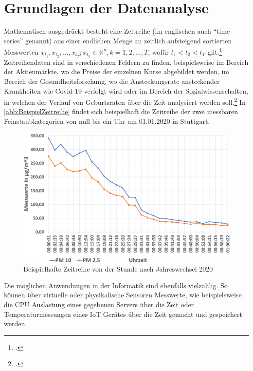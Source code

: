 \section{Grundlagen der Datenanalyse}\label{chap:GrundlagenDatenanalyse}

Mathematisch ausgedrückt besteht eine Zeitreihe (im englischen auch \enquote{time series} genannt) aus einer endlichen Menge an zeitlich aufsteigend sortierten Messwerten $x_{t_1},x_{t_2},...,x_{t_T};  x_{t_k} \in \mathbb{R}^n, k=1,2,...,T$, wofür $t_1 < t_2 < t_T $ gilt.\footcite[Vgl.][1]{Deistler.2018b} 
Zeitreihendaten sind in verschiedenen Feldern zu finden, beispielsweise im Bereich der Aktienmärkte, wo die Preise der einzelnen Kurse abgebildet werden, im Bereich der Gesundheitsforschung, wo die Ansteckungsrate ansteckender Krankheiten wie Covid-19 verfolgt wird oder im Bereich der Sozialwissenschaften, in welchen der Verlauf von Geburtsraten über die Zeit analysiert werden soll.\footcite[Vgl.][1]{Shumway.2017b} 
In \autoref{abb:BeispielZeitreihe} findet sich beispielhaft die Zeitreihe der zwei messbaren Feinstaubkategorien von null bis ein Uhr am 01.01.2020 in Stuttgart.

\begin{figure}[H]
\centering
\includegraphics[width=\textwidth]{graphics/Feinstaub-Stuttgart.png}
\caption{Beispielhafte Zeitreihe von der Stunde nach Jahreswechsel 2020}
\label{abb:BeispielZeitreihe}
\end{figure}

Die möglichen Anwendungen in der Informatik sind ebenfalls vielzählig. So können über virtuelle oder physikalische Sensoren Messwerte, wie beispielsweise die CPU Auslastung eines gegebenen Servers über die Zeit oder Temperaturmessungen eines \ac{IoT} Gerätes über die Zeit gemacht und gespeichert werden.


